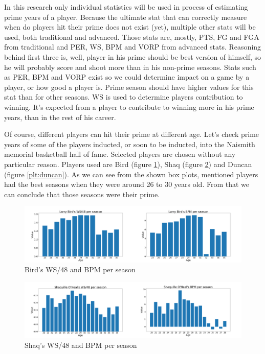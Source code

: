 \documentclass[a4paper]{article}
\begin{document}
In this research only individual statistics will be used in process of estimating prime years of a player. Because the ultimate stat that can correctly measure when do players hit their prime does not exist (yet), multiple other stats will be used, both traditional and advanced. Those stats are, mostly, PTS, FG and FGA from traditional and PER, WS, BPM and VORP from advanced stats. Reasoning behind first three is, well, player in his prime should be best version of himself, so he will probably score and shoot more than in his non-prime seasons. Stats such as PER, BPM and VORP exist so we could determine impact on a game by a player, or how good a player is. Prime season should have higher values for this stat than for other seasons. WS is used to determine players contribution to winning. It's expected from a player to contribute to winning more in his prime years, than in the rest of his career.

Of course, different players can hit their prime at different age. Let's check prime years of some of the players inducted, or soon to be inducted, into the Naismith memorial basketball hall of fame. Selected players are chosen without any particular reason. Players used are Bird (figure \ref{plt:bird}), Shaq (figure \ref{plt:shaq}) and Duncan (figure \ref{plt:duncan}). As we can see from the shown box plots, mentioned players had the best seasons when they were around 26 to 30 years old. From that we can conclude that those seasons were their prime.


\begin{figure}[h!]
\begin{center}
\includegraphics[scale=0.30]{bird.png}
\end{center}
\caption{Bird's WS/48 and BPM per season}
\label{plt:bird}
\end{figure}

\begin{figure}[h!]
\begin{center}
\includegraphics[scale=0.30]{shaq.png} %
\end{center}
\caption{Shaq's WS/48 and BPM per season}
\label{plt:shaq}
\end{figure}
\end{document}
